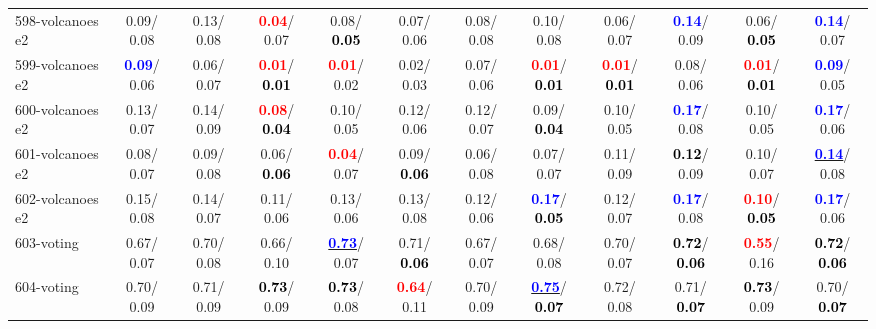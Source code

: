 \begin{table}[h]
\begin{center}
{\begin{tabular}{lc|c|c|c|c|c|c|c|c|c|c}
598-volcanoes e2 &   0.09/  0.08 &   0.13/  0.08 & \textcolor{red}{\textbf{  0.04}}/  0.07 &   0.08/\textcolor{black}{\textbf{  0.05}} &   0.07/  0.06 &   0.08/  0.08 &   0.10/  0.08 &   0.06/  0.07 & \textcolor{blue}{\textbf{  0.14}}/  0.09 &   0.06/\textcolor{black}{\textbf{  0.05}} & \textcolor{blue}{\textbf{  0.14}}/  0.07 \\
599-volcanoes e2 & \textcolor{blue}{\textbf{  0.09}}/  0.06 &   0.06/  0.07 & \textcolor{red}{\textbf{  0.01}}/\textcolor{black}{\textbf{  0.01}} & \textcolor{red}{\textbf{  0.01}}/  0.02 &   0.02/  0.03 &   0.07/  0.06 & \textcolor{red}{\textbf{  0.01}}/\textcolor{black}{\textbf{  0.01}} & \textcolor{red}{\textbf{  0.01}}/\textcolor{black}{\textbf{  0.01}} &   0.08/  0.06 & \textcolor{red}{\textbf{  0.01}}/\textcolor{black}{\textbf{  0.01}} & \textcolor{blue}{\textbf{  0.09}}/  0.05 \\
600-volcanoes e2 &   0.13/  0.07 &   0.14/  0.09 & \textcolor{red}{\textbf{  0.08}}/\textcolor{black}{\textbf{  0.04}} &   0.10/  0.05 &   0.12/  0.06 &   0.12/  0.07 &   0.09/\textcolor{black}{\textbf{  0.04}} &   0.10/  0.05 & \textcolor{blue}{\textbf{  0.17}}/  0.08 &   0.10/  0.05 & \textcolor{blue}{\textbf{  0.17}}/  0.06 \\
601-volcanoes e2 &   0.08/  0.07 &   0.09/  0.08 &   0.06/\textcolor{black}{\textbf{  0.06}} & \textcolor{red}{\textbf{  0.04}}/  0.07 &   0.09/\textcolor{black}{\textbf{  0.06}} &   0.06/  0.08 &   0.07/  0.07 &   0.11/  0.09 & \textcolor{black}{\textbf{  0.12}}/  0.09 &   0.10/  0.07 & \underline{\textcolor{blue}{\textbf{  0.14}}}/  0.08 \\
602-volcanoes e2 &   0.15/  0.08 &   0.14/  0.07 &   0.11/  0.06 &   0.13/  0.06 &   0.13/  0.08 &   0.12/  0.06 & \textcolor{blue}{\textbf{  0.17}}/\textcolor{black}{\textbf{  0.05}} &   0.12/  0.07 & \textcolor{blue}{\textbf{  0.17}}/  0.08 & \textcolor{red}{\textbf{  0.10}}/\textcolor{black}{\textbf{  0.05}} & \textcolor{blue}{\textbf{  0.17}}/  0.06 \\
603-voting &   0.67/  0.07 &   0.70/  0.08 &   0.66/  0.10 & \underline{\textcolor{blue}{\textbf{  0.73}}}/  0.07 &   0.71/\textcolor{black}{\textbf{  0.06}} &   0.67/  0.07 &   0.68/  0.08 &   0.70/  0.07 & \textcolor{black}{\textbf{  0.72}}/\textcolor{black}{\textbf{  0.06}} & \textcolor{red}{\textbf{  0.55}}/  0.16 & \textcolor{black}{\textbf{  0.72}}/\textcolor{black}{\textbf{  0.06}} \\
604-voting &   0.70/  0.09 &   0.71/  0.09 & \textcolor{black}{\textbf{  0.73}}/  0.09 & \textcolor{black}{\textbf{  0.73}}/  0.08 & \textcolor{red}{\textbf{  0.64}}/  0.11 &   0.70/  0.09 & \underline{\textcolor{blue}{\textbf{  0.75}}}/\textcolor{black}{\textbf{  0.07}} &   0.72/  0.08 &   0.71/\textcolor{black}{\textbf{  0.07}} & \textcolor{black}{\textbf{  0.73}}/  0.09 &   0.70/\textcolor{black}{\textbf{  0.07}} \\ \hline

\end{tabular}}
\end{center}
\end{table}
